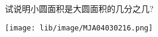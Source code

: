 试说明小圆面积是大圆面积的几分之几?

\begin{flushright}

    \texttt{[image: lib/image/MJA04030216.png]}

\end{flushright}



